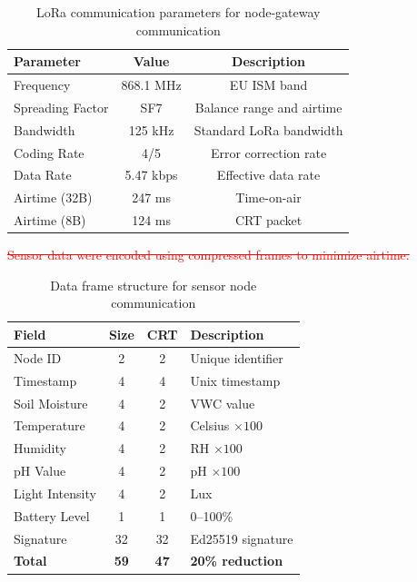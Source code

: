 \documentclass[pdflatex,sn-mathphys-num]{sn-jnl}
\theoremstyle{thmstyleone}
\theoremstyle{thmstyletwo}
\theoremstyle{thmstylethree}
\begin{document}
{\begin{table}[htbp]
\centering
\caption{LoRa communication parameters for node-gateway communication}
\label{tab:lora-params}
\begin{tabular}{lcc}
\toprule
\textbf{Parameter} & \textbf{Value} & \textbf{Description} \\
\midrule
Frequency          & 868.1 MHz & EU ISM band \\
Spreading Factor   & SF7       & Balance range and airtime \\
Bandwidth          & 125 kHz   & Standard LoRa bandwidth \\
Coding Rate        & 4/5       & Error correction rate \\
Data Rate          & 5.47 kbps & Effective data rate \\
Airtime (32B)      & 247 ms    & Time-on-air \\
Airtime (8B)       & 124 ms    & CRT packet \\
\bottomrule
\end{tabular}
\end{table}
\textcolor{red}{\sout{Sensor data were encoded using compressed frames to minimize airtime.}}

\begin{table}[htbp]
\centering
\caption{Data frame structure for sensor node communication}
\label{tab:data-frame}
\begin{tabular}{p{2.2cm} c c p{4.5cm}}
\toprule
\textbf{Field} & \textbf{Size} & \textbf{CRT} & \textbf{Description} \\
\midrule
Node ID        & 2  & 2  & Unique identifier \\
Timestamp      & 4  & 4  & Unix timestamp \\
Soil Moisture  & 4  & 2  & VWC value \\
Temperature    & 4  & 2  & Celsius $\times 100$ \\
Humidity       & 4  & 2  & RH $\times 100$ \\
pH Value       & 4  & 2  & pH $\times 100$ \\
Light Intensity& 4  & 2  & Lux \\
Battery Level  & 1  & 1  & 0--100\% \\
Signature      & 32 & 32 & Ed25519 signature \\
\midrule
\textbf{Total} & \textbf{59} & \textbf{47} & \textbf{20\% reduction} \\
\bottomrule
\end{tabular}
\end{table}

}
\end{document}
